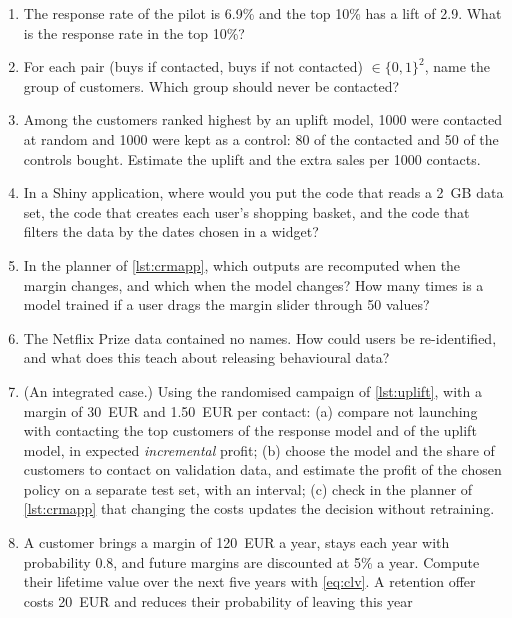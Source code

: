\begin{enumerate}[label=\textbf{7.\arabic*},ref=7.\arabic*,leftmargin=*,itemsep=6pt]
        configuration of \cref{lst:mailing}. How does this explain why the second configuration mails more customers?
  \item\label{exr7:lift} The response rate of the pilot is 6.9\% and the top 10\% has a lift of 2.9. What is the response rate in the top
        10\%?
  \item\label{exr7:groups} For each pair (buys if contacted, buys if not contacted) $\in\{0,1\}^2$, name the group of customers. Which group
        should never be contacted?
  \item\label{exr7:upliftcalc} Among the customers ranked highest by an uplift model, 1000 were contacted at random and 1000 were kept as a
        control: 80 of the contacted and 50 of the controls bought. Estimate the uplift and the extra sales per 1000 contacts.
  \item\label{exr7:place} In a Shiny application, where would you put the code that reads a 2~GB data set, the code that creates each user's
        shopping basket, and the code that filters the data by the dates chosen in a widget?
  \item\label{exr7:graph} In the planner of \cref{lst:crmapp}, which outputs are recomputed when the margin changes, and which when the model
        changes? How many times is a model trained if a user drags the margin slider through 50 values?
  \item\label{exr7:privacy} The Netflix Prize data contained no names. How could users be re-identified, and what does this teach about
        releasing behavioural data?
  \item\label{exr7:integrated} (An integrated case.) Using the randomised campaign of \cref{lst:uplift}, with a margin of
        30~EUR and 1.50~EUR per contact: (a) compare not launching with contacting the top customers of the response model
        and of the uplift model, in expected \emph{incremental} profit; (b) choose the model and the share of customers to
        contact on validation data, and estimate the profit of the chosen policy on a separate test set, with an interval;
        (c) check in the planner of \cref{lst:crmapp} that changing the costs updates the decision without retraining.
\item\label{exr7:clv} A customer brings a margin of 120~EUR a year, stays each year with probability 0.8,
and future margins are discounted at 5\% a year. Compute their lifetime value over the next five years
with \cref{eq:clv}. A retention offer costs 20~EUR and reduces their probability of leaving this year

\end{enumerate}
